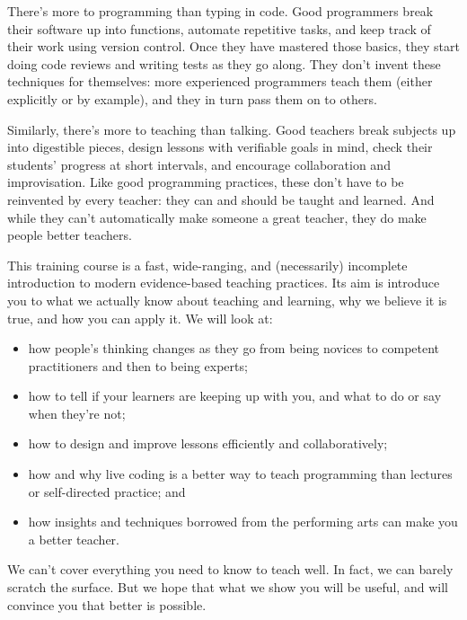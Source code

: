 
There's more to programming than typing in code.  Good programmers
break their software up into functions, automate repetitive tasks, and
keep track of their work using version control.  Once they have
mastered those basics, they start doing code reviews and writing tests
as they go along.  They don't invent these techniques for themselves:
more experienced programmers teach them (either explicitly or by
example), and they in turn pass them on to others.

Similarly, there's more to teaching than talking.  Good teachers break
subjects up into digestible pieces, design lessons with verifiable
goals in mind, check their students' progress at short intervals, and
encourage collaboration and improvisation.  Like good programming
practices, these don't have to be reinvented by every teacher: they
can and should be taught and learned.  And while they can't
automatically make someone a great teacher, they do make people better
teachers.

This training course is a fast, wide-ranging, and (necessarily)
incomplete introduction to modern evidence-based teaching practices.
Its aim is introduce you to what we actually know about teaching and
learning, why we believe it is true, and how you can apply it.  We
will look at:

\begin{itemize}

\item
  how people's thinking changes as they go from being novices to
  competent practitioners and then to being experts;

\item
  how to tell if your learners are keeping up with you, and what to
  do or say when they're not;

\item
  how to design and improve lessons efficiently and collaboratively;

\item
  how and why live coding is a better way to teach programming than
  lectures or self-directed practice; and

\item
  how insights and techniques borrowed from the performing arts can
  make you a better teacher.

\end{itemize}

We can't cover everything you need to know to teach well.  In fact,
we can barely scratch the surface.  But we hope that what we show you
will be useful, and will convince you that better is possible.

